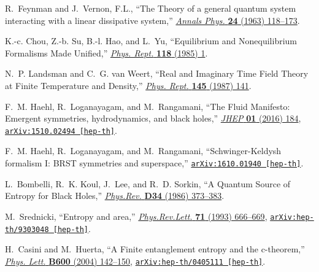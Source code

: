 \begin{thebibliography}{100}
R.~Feynman and J.~Vernon, F.L., ``{The Theory of a general quantum system
  interacting with a linear dissipative system},''
\href{http://dx.doi.org/10.1016/0003-4916(63)90068-X}{{\em Annals Phys.} {\bf
  24} (1963)  118--173}.

K.-c. Chou, Z.-b. Su, B.-l. Hao, and L.~Yu, ``{Equilibrium and Nonequilibrium
  Formalisms Made Unified},''
\href{http://dx.doi.org/10.1016/0370-1573(85)90136-X}{{\em Phys. Rept.} {\bf
  118} (1985)  1}.

N.~P. Landsman and C.~G. van Weert, ``{Real and Imaginary Time Field Theory at
  Finite Temperature and Density},''
\href{http://dx.doi.org/10.1016/0370-1573(87)90121-9}{{\em Phys. Rept.} {\bf
  145} (1987)  141}.

F.~M. Haehl, R.~Loganayagam, and M.~Rangamani, ``{The Fluid Manifesto: Emergent
  symmetries, hydrodynamics, and black holes},''
  \href{http://dx.doi.org/10.1007/JHEP01(2016)184}{{\em JHEP} {\bf 01} (2016)
  184},
\href{http://arxiv.org/abs/1510.02494}{{\tt arXiv:1510.02494 [hep-th]}}.

F.~M. Haehl, R.~Loganayagam, and M.~Rangamani, ``{Schwinger-Keldysh formalism
  I: BRST symmetries and superspace},''
\href{http://arxiv.org/abs/1610.01940}{{\tt arXiv:1610.01940 [hep-th]}}.

L.~Bombelli, R.~K. Koul, J.~Lee, and R.~D. Sorkin, ``{A Quantum Source of
  Entropy for Black Holes},''
\href{http://dx.doi.org/10.1103/PhysRevD.34.373}{{\em Phys.Rev.} {\bf D34}
  (1986)  373--383}.

M.~Srednicki, ``{Entropy and area},''
  \href{http://dx.doi.org/10.1103/PhysRevLett.71.666}{{\em Phys.Rev.Lett.} {\bf
  71} (1993)  666--669},
\href{http://arxiv.org/abs/hep-th/9303048}{{\tt arXiv:hep-th/9303048
  [hep-th]}}.

H.~Casini and M.~Huerta, ``{A Finite entanglement entropy and the c-theorem},''
  \href{http://dx.doi.org/10.1016/j.physletb.2004.08.072}{{\em Phys. Lett.}
  {\bf B600} (2004)  142--150},
\href{http://arxiv.org/abs/hep-th/0405111}{{\tt arXiv:hep-th/0405111
  [hep-th]}}.


\end{thebibliography}
